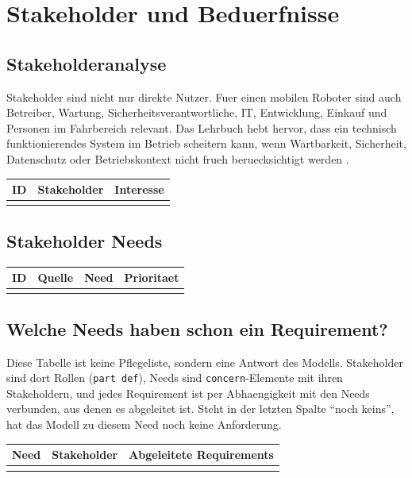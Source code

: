 \chapter{Stakeholder und Beduerfnisse}

\section{Stakeholderanalyse}

Stakeholder sind nicht nur direkte Nutzer. Fuer einen mobilen Roboter sind auch Betreiber, Wartung, Sicherheitsverantwortliche, IT, Entwicklung, Einkauf und Personen im Fahrbereich relevant. Das Lehrbuch hebt hervor, dass ein technisch funktionierendes System im Betrieb scheitern kann, wenn Wartbarkeit, Sicherheit, Datenschutz oder Betriebskontext nicht frueh beruecksichtigt werden \cite[Kap.~7]{becker2026sysml}.

\begin{longtable}{L{0.18\textwidth} L{0.30\textwidth} L{0.38\textwidth}}
\toprule
ID & Stakeholder & Interesse \\
\midrule
{}
\bottomrule
\end{longtable}

\section{Stakeholder Needs}

\begin{longtable}{L{0.15\textwidth} L{0.18\textwidth} L{0.47\textwidth} L{0.10\textwidth}}
\toprule
ID & Quelle & Need & Prioritaet \\
\midrule
{}
\bottomrule
\end{longtable}

\section{Welche Needs haben schon ein Requirement?}

Diese Tabelle ist keine Pflegeliste, sondern eine Antwort des Modells. Stakeholder sind dort Rollen (\texttt{part def}), Needs sind \texttt{concern}-Elemente mit ihren Stakeholdern, und jedes Requirement ist per Abhaengigkeit mit den Needs verbunden, aus denen es abgeleitet ist. Steht in der letzten Spalte \enquote{noch keins}, hat das Modell zu diesem Need noch keine Anforderung.

\begin{longtable}{L{0.18\textwidth} L{0.26\textwidth} L{0.42\textwidth}}
\toprule
Need & Stakeholder & Abgeleitete Requirements \\
\midrule
{}
\bottomrule
\end{longtable}


